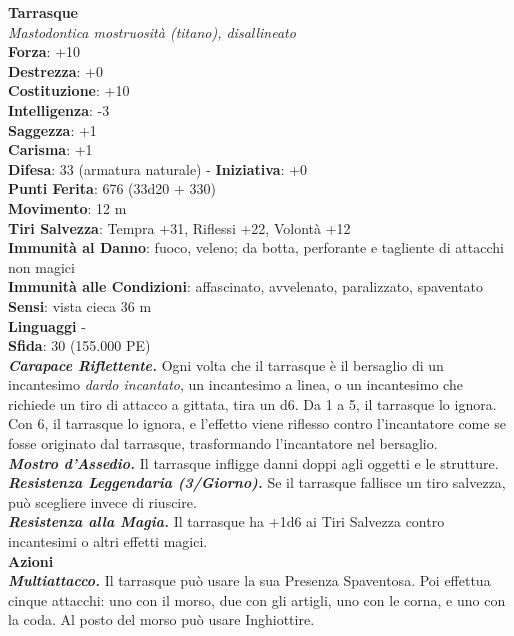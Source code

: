 \begin{multicols}{2}
\medskip\textbf{Tarrasque}\\
\emph{Mastodontica mostruosità (titano), disallineato}\\
\textbf{Forza}: +10\\
\textbf{Destrezza}: +0\\
\textbf{Costituzione}: +10\\
\textbf{Intelligenza}: -3\\
\textbf{Saggezza}: +1\\
\textbf{Carisma}: +1\\
\textbf{Difesa}: 33 (armatura naturale) - \textbf{Iniziativa}: +0\\
\textbf{Punti Ferita}: 676 (33d20 + 330)\\
\textbf{Movimento}: 12 m\\
\textbf{Tiri Salvezza}: Tempra +31, Riflessi +22, Volontà +12\\
\textbf{Immunità al Danno}: fuoco, veleno; da botta, perforante e tagliente di attacchi non magici\\
\textbf{Immunità alle Condizioni}: affascinato, avvelenato, paralizzato, spaventato\\
\textbf{Sensi}: vista cieca 36 m \\
\textbf{Linguaggi} -\\
\textbf{Sfida}: 30 (155.000 PE)\smallskip\\
\emph{\textbf{Carapace Riflettente.}} Ogni volta che il tarrasque è il bersaglio di un incantesimo \emph{dardo incantato}, un incantesimo a linea, o un incantesimo che richiede un tiro di attacco a gittata, tira un d6. Da 1 a 5, il tarrasque lo ignora. Con 6, il tarrasque lo ignora, e l'effetto viene riflesso contro l'incantatore come se fosse originato dal tarrasque, trasformando l'incantatore nel bersaglio. \\
\emph{\textbf{Mostro d'Assedio.}} Il tarrasque infligge danni doppi agli oggetti e le strutture.\\
\emph{\textbf{Resistenza Leggendaria (3/Giorno).}} Se il tarrasque fallisce un tiro salvezza, può scegliere invece di riuscire.\\
\emph{\textbf{Resistenza alla Magia.}} Il tarrasque ha +1d6 ai Tiri Salvezza contro incantesimi o altri effetti magici.\\
\smallskip\textbf{Azioni}\\
\emph{\textbf{Multiattacco.}} Il tarrasque può usare la sua Presenza Spaventosa. Poi effettua cinque attacchi: uno con il morso, due con gli artigli, uno con le corna, e uno con la coda. Al posto del morso può usare Inghiottire.\\

\end{multicols}

